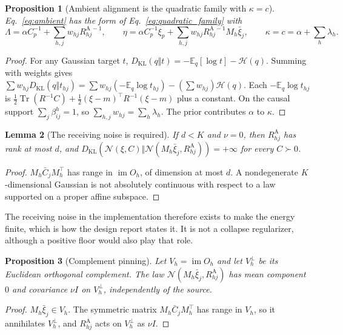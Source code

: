 \documentclass[11pt]{article}
\newtheorem{proposition}{Proposition}
\newtheorem{lemma}[proposition]{Lemma}
\theoremstyle{definition}
\theoremstyle{remark}
\newcommand{\KL}{D_{\mathrm{KL}}}
\newcommand{\Tr}{\operatorname{Tr}}
\newcommand{\E}{\mathbb{E}}
\newcommand{\N}{\mathcal{N}}
\newcommand{\Hent}{\mathcal{H}}
\newcommand{\im}{\operatorname{im}}
\begin{document}
\begin{proposition}[Ambient alignment is the quadratic family with $\kappa=c$]
\label{prop:ambient}
Eq.~\eqref{eq:ambient} has the form of Eq.~\eqref{eq:quadratic_family} with
\begin{equation}
\Lambda=\alpha C_p^{-1}+\sum_{h,j}w_{hj}R^{\mathrm A\,-1}_{hj},\qquad
\eta=\alpha C_p^{-1}\xi_p+\sum_{h,j}w_{hj}R^{\mathrm A\,-1}_{hj}M_h\bar\xi_j,\qquad
\kappa=c=\alpha+\sum_h\lambda_h.
\end{equation}
\end{proposition}

\begin{proof}
For any Gaussian target $t$, $\KL(q\Vert t)=-\E_q[\log t]-\Hent(q)$. Summing with weights gives $\sum w_{hj}\KL(q\Vert t_{hj})=\sum w_{hj}(-\E_q\log t_{hj})-(\sum w_{hj})\Hent(q)$. Each $-\E_q\log t_{hj}$ is $\tfrac12\Tr(R^{-1}C)+\tfrac12(\xi-m)^\top R^{-1}(\xi-m)$ plus a constant. On the causal support $\sum_j\beta_{ij}^h=1$, so $\sum_{h,j}w_{hj}=\sum_h\lambda_h$. The prior contributes $\alpha$ to $\kappa$.
\end{proof}

\begin{lemma}[The receiving noise is required]
\label{lem:noise_required}
If $d<K$ and $\nu=0$, then $R^{\mathrm A}_{hj}$ has rank at most $d$, and $\KL(\N(\xi,C)\Vert\N(M_h\bar\xi_j,R^{\mathrm A}_{hj}))=+\infty$ for every $C\succ0$.
\end{lemma}

\begin{proof}
$M_h\bar C_jM_h^\top$ has range in $\im O_h$, of dimension at most $d$. A nondegenerate $K$-dimensional Gaussian is not absolutely continuous with respect to a law supported on a proper affine subspace.
\end{proof}

The receiving noise in the implementation therefore exists to make the energy finite, which is how the design report states it. It is not a collapse regularizer, although a positive floor would also play that role.

\begin{proposition}[Complement pinning]
\label{prop:pinning}
Let $V_h=\im O_h$ and let $V_h^\perp$ be its Euclidean orthogonal complement. The law $\N(M_h\bar\xi_j,R^{\mathrm A}_{hj})$ has mean component $0$ and covariance $\nu I$ on $V_h^\perp$, independently of the source.
\end{proposition}

\begin{proof}
$M_h\bar\xi_j\in V_h$. The symmetric matrix $M_h\bar C_jM_h^\top$ has range in $V_h$, so it annihilates $V_h^\perp$, and $R^{\mathrm A}_{hj}$ acts on $V_h^\perp$ as $\nu I$.
\end{proof}
\end{document}
